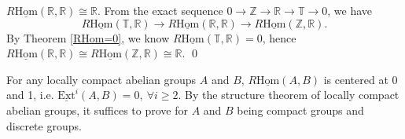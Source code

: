 \documentclass[UTF8,12,a4paper]{ctexart}
\theoremstyle{definition}
\begin{document}
\cor 
$R\underline{\text{Hom}}(\mathbb{R},\mathbb{R})\cong \mathbb{R}.$
\pf 
From the exact sequence $0\to \mathbb{Z}\to \mathbb{R}\to \mathbb{T}\to 0$, we have 
$$R\underline{\text{Hom}}(\mathbb{T},\mathbb{R})\rightarrow R\underline{\text{Hom}}(\mathbb{R},\mathbb{R})\rightarrow R\underline{\text{Hom}}(\mathbb{Z},\mathbb{R}).$$
By Theorem \ref{RHom=0}, we know $R\underline{\text{Hom}}(\mathbb{T},\mathbb{R})=0$, hence $R\underline{\text{Hom}}(\mathbb{R},\mathbb{R})\cong R\underline{\text{Hom}}(\mathbb{Z},\mathbb{R})\cong \mathbb{R}.$
\qed

\cor 
For any locally compact abelian groups $A$ and $B$, $R\underline{\text{Hom}}(A,B)$ is centered at 0 and 1, i.e. $\underline{\text{Ext}}^i(A,B)=0,\ \forall i\geq 2.$
\pf 
By the structure theorem of locally compact abelian groups, it suffices to prove for $A$ and $B$ being compact groups and discrete groups.
\end{document}
